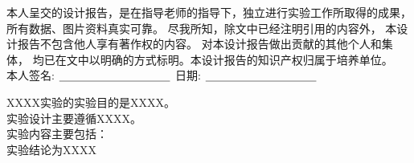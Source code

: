 


\newpage
\thispagestyle{empty}
\vspace*{20pt}
\begin{center}{}\end{center}
\par\vspace*{30pt}
\renewcommand{\baselinestretch}{2}

{%

本人呈交的设计报告，是在指导老师的指导下，独立进行实验工作所取得的成果，
所有数据、图片资料真实可靠。 尽我所知，除文中已经注明引用的内容外，
本设计报告不包含他人享有著作权的内容。
对本设计报告做出贡献的其他个人和集体，
均已在文中以明确的方式标明。本设计报告的知识产权归属于培养单位。\\[2cm]

\hspace*{1cm}本人签名: $\underline{\hspace{3.5cm}}$
\hspace{2cm}日期: $\underline{\hspace{3.5cm}}$\hfill\par}
\baselineskip=23pt  %





\begin{cnabstract}
\thispagestyle{empty}

XXXX实验的实验目的是XXXX。\\
实验设计主要遵循XXXX。\\
实验内容主要包括：\\
实验结论为XXXX   \\



\end{cnabstract}
\par
\vspace*{2em}





